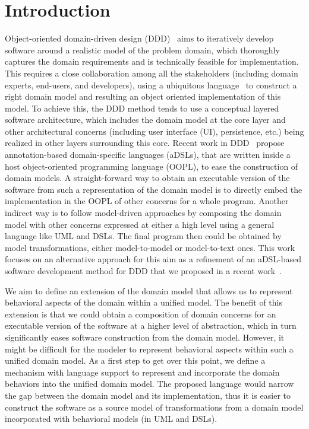 %
\section{Introduction}\label{sect:introduction}
Object-oriented domain-driven design (DDD)~\cite{evans_domain-driven_2004} aims to iteratively develop software around a realistic model of the problem domain, which thoroughly captures the domain requirements and is technically feasible for implementation. This requires a close collaboration among all the stakeholders (including domain experts, end-users, and developers), using a ubiquitous language~\cite{evans_domain-driven_2004} to construct a right domain model and resulting an object oriented implementation of this model. To achieve this, the DDD method tends to use a conceptual layered software architecture, which includes the domain model at the core layer and other architectural concerns (including user interface (UI), persistence, etc.) being realized in other layers surrounding this core. %
%
%
Recent work in DDD~\cite{dan_haywood_apache_2013, paniza_learn_2011} propose  annotation-based domain-specific languages (aDSLs), that are written inside a host object-oriented programming language (OOPL), to ease the construction of domain models. A straight-forward way to obtain an executable version of the software from such a representation of the domain model is to directly embed the implementation in the OOPL of other concerns for a whole program. Another indirect way is to follow model-driven approaches by composing the domain model with other concerns expressed at either a high level using a general language like UML and DSLs. The final program then could be obtained by model transformations, either model-to-model or model-to-text ones. This work focuses on an alternative approach for this aim as a refinement of an aDSL-based software development method for DDD that we proposed in a recent work~\cite{le_domain_2018}.

We aim to define an extension of the domain model that allows us to represent behavioral aspects of the domain within a unified model. The benefit of this extension is that we could obtain a composition of domain concerns for an executable version of the software at a higher level of abstraction, which in turn significantly eases software construction from the domain model. However, it might be difficult for the modeler to represent behavioral aspects within such a unified domain model. As a first step to get over this point, we define a mechanism with language support to represent and incorporate the domain behaviors into the unified domain model. The proposed language would narrow the gap between the domain model and its implementation, thus it is easier to construct the software as a source model of transformations from a domain model incorporated with behavioral models (in UML and DSLs).

